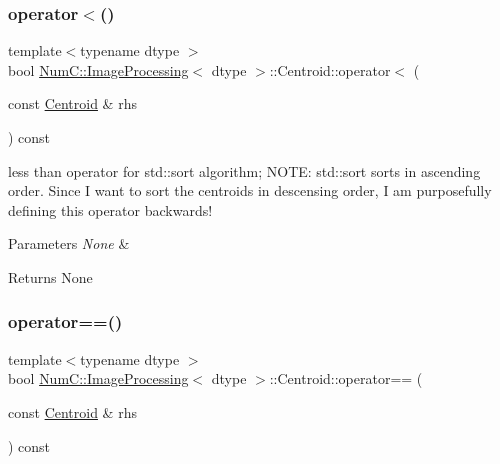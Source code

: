 \subsubsection{\texorpdfstring{operator$<$()}{operator<()}}
{\footnotesize\ttfamily template$<$typename dtype $>$ \\
bool \mbox{\hyperlink{class_num_c_1_1_image_processing}{Num\+C\+::\+Image\+Processing}}$<$ dtype $>$\+::Centroid\+::operator$<$ (\begin{DoxyParamCaption}\item[{const \mbox{\hyperlink{class_num_c_1_1_image_processing_1_1_centroid}{Centroid}} \&}]{rhs }\end{DoxyParamCaption}) const\hspace{0.3cm}{\ttfamily [inline]}}

less than operator for std\+::sort algorithm; N\+O\+TE\+: std\+::sort sorts in ascending order. Since I want to sort the centroids in descensing order, I am purposefully defining this operator backwards!


\begin{DoxyParams}{Parameters}
{\em None} & \\
\hline
\end{DoxyParams}
\begin{DoxyReturn}{Returns}
None 
\end{DoxyReturn}
\mbox{\label{class_num_c_1_1_image_processing_1_1_centroid_af639065a7a27107954ebd034c7cfdb1c}} 
\subsubsection{\texorpdfstring{operator==()}{operator==()}}
{\footnotesize\ttfamily template$<$typename dtype $>$ \\
bool \mbox{\hyperlink{class_num_c_1_1_image_processing}{Num\+C\+::\+Image\+Processing}}$<$ dtype $>$\+::Centroid\+::operator== (\begin{DoxyParamCaption}\item[{const \mbox{\hyperlink{class_num_c_1_1_image_processing_1_1_centroid}{Centroid}} \&}]{rhs }\end{DoxyParamCaption}) const\hspace{0.3cm}{\ttfamily [inline]}}

